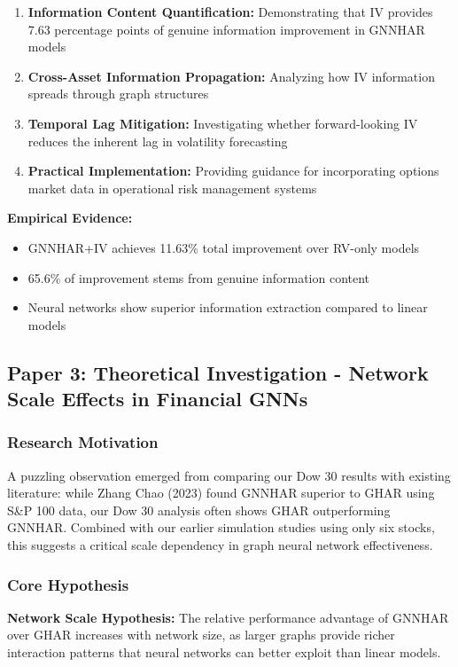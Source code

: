 \documentclass[12pt,a4paper]{article}
\begin{document}
\begin{enumerate}
\item \textbf{Information Content Quantification:} Demonstrating that IV provides 7.63 percentage points of genuine information improvement in GNNHAR models
\item \textbf{Cross-Asset Information Propagation:} Analyzing how IV information spreads through graph structures
\item \textbf{Temporal Lag Mitigation:} Investigating whether forward-looking IV reduces the inherent lag in volatility forecasting
\item \textbf{Practical Implementation:} Providing guidance for incorporating options market data in operational risk management systems
\end{enumerate}

\textbf{Empirical Evidence:}
\begin{itemize}
\item GNNHAR+IV achieves 11.63\% total improvement over RV-only models
\item 65.6\% of improvement stems from genuine information content
\item Neural networks show superior information extraction compared to linear models
\end{itemize}

\subsection{Paper 3: Theoretical Investigation - Network Scale Effects in Financial GNNs}

\subsubsection{Research Motivation}

A puzzling observation emerged from comparing our Dow 30 results with existing literature: while Zhang Chao (2023) found GNNHAR superior to GHAR using S\&P 100 data, our Dow 30 analysis often shows GHAR outperforming GNNHAR. Combined with our earlier simulation studies using only six stocks, this suggests a critical scale dependency in graph neural network effectiveness.

\subsubsection{Core Hypothesis}

\textbf{Network Scale Hypothesis:} The relative performance advantage of GNNHAR over GHAR increases with network size, as larger graphs provide richer interaction patterns that neural networks can better exploit than linear models.
\end{document}
